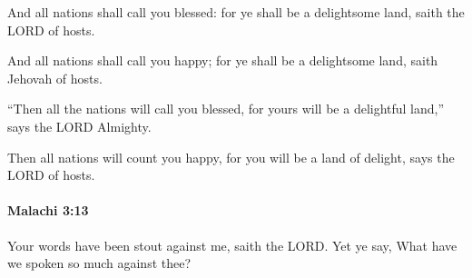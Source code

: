 			And all nations shall call you blessed: for ye shall be a delightsome land, saith the LORD of hosts.

			\begin{versebox}
					\item[BHS] 
					\item[LXX] 
					\item[ASV] And all nations shall call you happy; for ye shall be a delightsome land, saith Jehovah of hosts.
					\item[NIV] “Then all the nations will call you blessed, for yours will be a delightful land,” says the LORD Almighty.
					\item[NRSV] Then all nations will count you happy, for you will be a land of delight, says the LORD of hosts.
			\end{versebox}

		\paragraph{Malachi 3:13} %
			\label{MALACHI-3-13}

			Your words have been stout against me, saith the LORD. Yet ye say, What have we spoken so much against thee?

